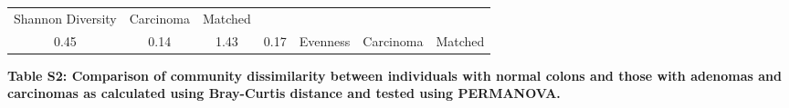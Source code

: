 \documentclass[12pt,]{article}
\begin{document}
\begin{longtable}[]{@{}ccccccc@{}}
\begin{minipage}[t]{0.14\columnwidth}
Shannon Diversity\strut
\end{minipage} & \begin{minipage}[t]{0.09\columnwidth}\centering\strut
Carcinoma\strut
\end{minipage} & \begin{minipage}[t]{0.11\columnwidth}\centering\strut
Matched\strut
\end{minipage}\tabularnewline
\begin{minipage}[t]{0.09\columnwidth}\centering\strut
0.45\strut
\end{minipage} & \begin{minipage}[t]{0.16\columnwidth}\centering\strut
0.14\strut
\end{minipage} & \begin{minipage}[t]{0.16\columnwidth}\centering\strut
1.43\strut
\end{minipage} & \begin{minipage}[t]{0.07\columnwidth}\centering\strut
0.17\strut
\end{minipage} & \begin{minipage}[t]{0.14\columnwidth}\centering\strut
Evenness\strut
\end{minipage} & \begin{minipage}[t]{0.09\columnwidth}\centering\strut
Carcinoma\strut
\end{minipage} & \begin{minipage}[t]{0.11\columnwidth}\centering\strut
Matched\strut
\end{minipage}\tabularnewline
\bottomrule
\end{longtable}

\normalsize

\newpage

\textbf{Table S2: Comparison of community dissimilarity between
individuals with normal colons and those with adenomas and carcinomas as
calculated using Bray-Curtis distance and tested using PERMANOVA.}
\end{document}
